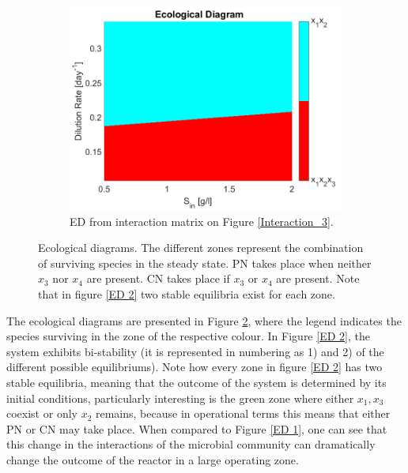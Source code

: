 \documentclass[3p,times]{article}
\begin{document}
\begin{figure}[h]
\begin{subfigure}[t]{0.32\textwidth}
	\includegraphics[width=\textwidth]{Stability/ED_parameters_modified_2}
	\caption{ED from interaction matrix on Figure \ref{Interaction_3}.}
	\label{ED 3}
\end{subfigure}

	\caption{Ecological diagrams. The different zones represent the combination of surviving species in the steady state. PN takes place when neither $x_3$ nor $x_4$ are present. CN takes place if $x_3$ or $x_4$ are present. Note that in figure \ref{ED 2} two stable equilibria exist for each zone. }
	\label{ecological_diagrams}
\end{figure}

The ecological diagrams are presented in Figure \ref{ecological_diagrams}, where the legend indicates the species surviving in the zone of the respective colour. In Figure \ref{ED 2}, the system exhibits bi-stability (it is represented in numbering as 1) and 2) of the different possible equilibriums). Note how every zone in figure \ref{ED 2} has two stable equilibria, meaning that the outcome of the system is determined by its initial conditions, particularly interesting is the green zone where either $x_1,x_3$ coexist or only $x_2$ remains, because in operational terms this means that either PN or CN may take place. When compared to Figure \ref{ED 1}, one can see that this change in the interactions of the microbial community can dramatically change the outcome of the reactor in a large operating zone. 
\end{document}
